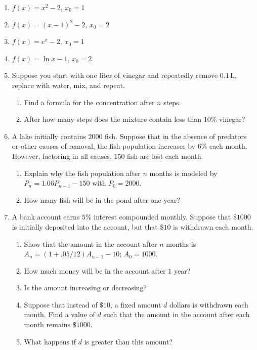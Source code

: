 \documentclass{exercises}
\begin{document}
\begin{enumerate}[resume]
\item \techrequired $f(x)=x^{2}-2$, $x_{0}=1$
\item \techrequired $f(x)={(x-1)}^{2}-2$, $x_{0}=2$
\item \techrequired $f(x)=e^{x}-2$, $x_{0}=1$
\item \techrequired $f(x)=\ln x-1$, $x_{0}=2$
\item \techrequired Suppose you start with one liter of vinegar and repeatedly remove $0.1\,\text{L}$, replace with water, mix, and repeat.
\begin{enumerate}[label=(\alph*)]
  \item Find a formula for the concentration after $n$ steps.
  \item After how many steps does the mixture contain less than $10\%$ vinegar?
\end{enumerate}
\item \techrequired A lake initially contains $2000$ fish. Suppose that in the absence of predators or other causes of removal, the fish population increases by $6\%$ each month. However, factoring in all causes, $150$ fish are lost each month.
\begin{enumerate}[label=(\alph*)]
  \item Explain why the fish population after $n$ months is modeled by $P_{n}=1.06P_{n-1}-150$ with $P_{0}=2000$.
  \item How many fish will be in the pond after one year?
\end{enumerate}\par
\item \techrequired A bank account earns $5\%$ interest compounded monthly. Suppose that $\$1000$ is initially deposited into the account, but that $\$10$ is withdrawn each month.
\begin{enumerate}[label=(\alph*)]
  \item Show that the amount in the account after $n$ months is $A_{n}=(1+.05/12)A_{n-1}-10$; $A_{0}=1000$.
  \item How much money will be in the account after $1$ year?
  \item Is the amount increasing or decreasing?
  \item Suppose that instead of $\$10$, a fixed amount $d$ dollars is withdrawn each month. Find a value of $d$ such that the amount in the account after each month remains $\$1000$.
  \item What happens if $d$ is greater than this amount?

\end{enumerate}
\end{enumerate}
\end{document}

